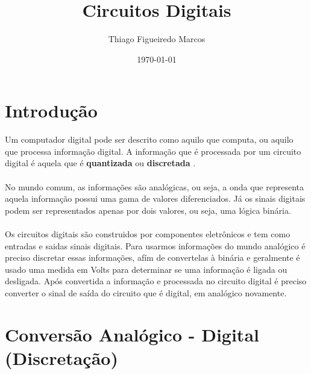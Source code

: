 \documentclass[12pt, onecolumn]{article}
\title{Circuitos Digitais}
\author{Thiago Figueiredo Marcos}
\date{\today}
\begin{document}
	
	\maketitle

	\section{Introdução}
	Um computador digital pode ser descrito como aquilo que computa, ou aquilo 
	que processa informação digital. A informação que é processada por um circuito 
	digital é aquela que é \textbf{quantizada} ou \textbf{discretada} \citep{art1}.\\
	\\
	No mundo comum, as informações são analógicas, ou seja, a onda que representa 
	aquela informação possui uma gama de valores diferenciados. Já os sinais digitais
	podem ser representados apenas por dois valores, ou seja, uma lógica binária.\citep{bk1}\\ 
	\\
	Os circuitos digitais são construidos por componentes eletrônicos e tem como
	entradas e saidas sinais digitais. Para usarmos informações do mundo analógico
	é preciso discretar essas informações, afím de convertelas à binária e geralmente é
	usado uma medida em Volts para determinar se uma informação é ligada ou desligada. 
	Após convertida a informação e processada no circuito digital é preciso converter
	o sinal de saída do circuito que é digital, em analógico novamente.\citep{art2}

	\section{Conversão Analógico - Digital (Discretação)}





	
        
\end{document}
